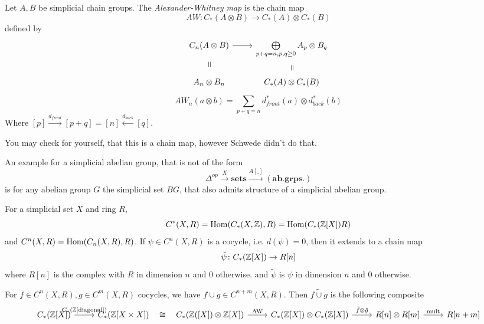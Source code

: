 \documentclass[language=english]{TemplateLecture}
\begin{document}
\begin{construction}
    Let \(A,B\) be simplicial chain groups. The \emph{Alexander-Whitney map} is the chain map
    \[AW\colon C_*(A\otimes B) \to C_*(A) \otimes C_*(B)\]
    defined by
    \[\begin{tikzcd}
        C_n(A\otimes B) \ar[d, phantom, sloped, "="]\ar[r] & \bigoplus\limits_{p+q = n, p,q \geq 0} A_p \otimes B_q \ar[d, phantom, sloped, "="] \\
        A_n \otimes B_n & C_*(A) \otimes C_*(B)
    \end{tikzcd}\]
    \[AW_n(a\otimes b) = \sum_{p+q = n} d_{front}^*(a) \otimes d_{back}^*(b)\]
    Where \([p] \xrightarrow{d_{front}} [p+q] = [n] \xleftarrow{d_{back}} [q]\).

    You may check for yourself, that this is a chain map, however Schwede didn't do that.
\end{construction}



\begin{Remark}
    An example for a simplicial abelian group, that is not of the form
    \[\Delta^{op} \xrightarrow{X} \mathbf{sets} \xrightarrow{A[\_]} (\mathbf{ab. grps.})\]
    is for any abelian group \(G\) the simplicial set \(BG\), that also admits structure of a simplicial abelian group.
\end{Remark}

\begin{remark}
    For a simplicial set \(X\) and ring \(R\),
    \[C^*(X,R) = \operatorname{Hom}(C_*(X,\mathbb{Z}), R) = \operatorname{Hom} (C_*(\mathbb{Z}[X])R)\]
    and \(C^n(X,R) = \operatorname{Hom}(C_n(X,R), R)\).
    If \(\psi \in C^n(X,R)\) is a cocycle, i.e. \(d(\psi) = 0\), then it extends to a chain map
    \[\tilde{\psi}\colon C_*(\mathbb{Z}[X]) \to R[n]\]
    where \(R[n]\) is the complex with \(R\) in dimension \(n\) and \(0\) otherwise.
    and \(\tilde{\psi}\) is \(\psi\) in dimension \(n\) and \(0\) otherwise.

    For \(f \in C^n(X,R), g\in C^m(X,R)\) cocycles, we have \(f\cup g \in C^{n+m}(X,R)\). Then \(\tilde{f\cup g}\) is the following composite
    \[\begin{tikzcd}
        {C_*(\IZ[X])} \ar[r, "{C_*(\IZ[\text{diagonal}])}"] & {C_*(\IZ[X \times X])} \ar[r, "\cong", phantom] & {C_*(\IZ([X]) \otimes \IZ[X])} \ar[r, "\text{AW}"] & {C_*(\IZ[X]) \otimes C_*(\IZ[X])} \ar[r, "\tilde{f} \otimes \tilde{g}"] & {R[n] \otimes R[m]} \ar[r, "\text{mult}"] & {R[n+m]} \\
    \end{tikzcd}\]
\end{remark}
\end{document}
